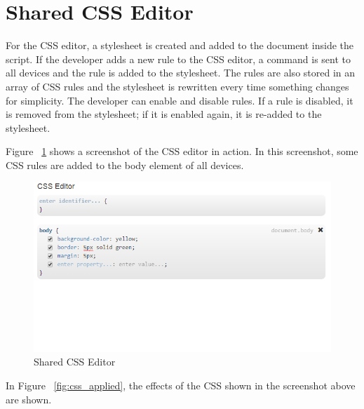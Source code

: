 \section{Shared CSS Editor}

For the CSS editor, a stylesheet is created and added to the document inside the script. If the developer adds a new rule to the CSS editor, a command is sent to all devices and the rule is added to the stylesheet. The rules are also stored in an array of CSS rules and the stylesheet is rewritten every time something changes for simplicity. The developer can enable and disable rules. If a rule is disabled, it is removed from the stylesheet; if it is enabled again, it is re-added to the stylesheet.

Figure ~\ref{fig:css_editor} shows a screenshot of the CSS editor in action. In this screenshot, some CSS rules are added to the body element of all devices.

\begin{figure}[H]
  \centering
    \includegraphics[width=1.0\textwidth]{images/screenshots/css_editor.png}
	\caption{Shared CSS Editor}
	\label{fig:css_editor}
\end{figure}

In Figure ~\ref{fig:css_applied}, the effects of the CSS shown in the screenshot above are shown. 

